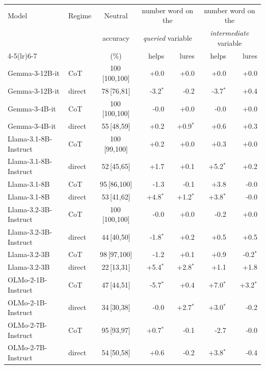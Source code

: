 \begin{tabular}{llcrrrr}
\toprule
Model & Regime & Neutral & \multicolumn{2}{c}{number word on the} & \multicolumn{2}{c}{number word on the} \\
& & accuracy & \multicolumn{2}{c}{\emph{queried} variable} & \multicolumn{2}{c}{\emph{intermediate} variable} \\
\cmidrule(lr){4-5}\cmidrule(lr){6-7}
& & (\%) & helps & lures & helps & lures \\
\midrule
Gemma-3-12B-it & CoT & 100\,{\scriptsize[100,100]} & +0.0 & +0.0 & +0.0 & +0.0 \\
Gemma-3-12B-it & direct & 78\,{\scriptsize[76,81]} & -3.2$^{*}$ & -0.2 & -3.7$^{*}$ & +0.4 \\
\addlinespace
Gemma-3-4B-it & CoT & 100\,{\scriptsize[100,100]} & -0.0 & +0.0 & -0.0 & +0.0 \\
Gemma-3-4B-it & direct & 55\,{\scriptsize[48,59]} & +0.2 & +0.9$^{*}$ & +0.6 & +0.3 \\
\addlinespace
Llama-3.1-8B-Instruct & CoT & 100\,{\scriptsize[99,100]} & +0.2 & +0.0 & +0.3 & +0.0 \\
Llama-3.1-8B-Instruct & direct & 52\,{\scriptsize[45,65]} & +1.7 & +0.1 & +5.2$^{*}$ & +0.2 \\
\addlinespace
Llama-3.1-8B & CoT & 95\,{\scriptsize[86,100]} & -1.3 & -0.1 & +3.8 & -0.0 \\
Llama-3.1-8B & direct & 53\,{\scriptsize[41,62]} & +4.8$^{*}$ & +1.2$^{*}$ & +3.8$^{*}$ & -0.0 \\
\addlinespace
Llama-3.2-3B-Instruct & CoT & 100\,{\scriptsize[100,100]} & -0.0 & +0.0 & -0.2 & +0.0 \\
Llama-3.2-3B-Instruct & direct & 44\,{\scriptsize[40,50]} & -1.8$^{*}$ & +0.2 & +0.5 & +0.5 \\
\addlinespace
Llama-3.2-3B & CoT & 98\,{\scriptsize[97,100]} & -1.2 & +0.1 & +0.9 & -0.2$^{*}$ \\
Llama-3.2-3B & direct & 22\,{\scriptsize[13,31]} & +5.4$^{*}$ & +2.8$^{*}$ & +1.1 & +1.8 \\
\addlinespace
OLMo-2-1B-Instruct & CoT & 47\,{\scriptsize[44,51]} & -5.7$^{*}$ & +0.4 & +7.0$^{*}$ & +3.2$^{*}$ \\
OLMo-2-1B-Instruct & direct & 34\,{\scriptsize[30,38]} & -0.0 & +2.7$^{*}$ & +3.0$^{*}$ & -0.2 \\
\addlinespace
OLMo-2-7B-Instruct & CoT & 95\,{\scriptsize[93,97]} & +0.7$^{*}$ & -0.1 & -2.7 & -0.0 \\
OLMo-2-7B-Instruct & direct & 54\,{\scriptsize[50,58]} & +0.6 & -0.2 & +3.8$^{*}$ & -0.4 \\
\bottomrule
\end{tabular}
